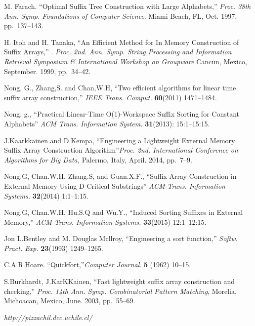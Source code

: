 \documentclass{ws-ijprai}
\begin{document}
\begin{thebibliography}{99}
 M. Farach. ``Optimal Suffix Tree Construction with
Large Alphabets,'' {\it Proc. 38th Ann. Symp. Foundations of Computer
Science}. Miami Beach, FL, Oct. 1997, pp.~137--143.

 H. Itoh and H. Tanaka, ``An Efficient Method for
In Memory Construction of Suffix Arrays,'' . {\it
Proc. 2nd. Ann. Symp. String Processing and Information Retrieval
Symposium \& International Workshop on Groupware} Cancun, Mexico,
September. 1999, pp.~34--42.

 Nong, G., Zhang,S. and Chan,W.H, ``Two efficient
algorithms for linear time suffix array construction,'' {\it IEEE
Trans. Comput.} {\bf 60}(2011) 1471--1484.

 Nong, g., ``Practical Linear-Time O(1)-Workspace
Suffix Sorting for Constant Alphabets'' {\it ACM Trans. Information
System.} {\bf 31}(2013): 15:1--15:15.

 J.Kaarkkainen and D.Kempa, ``Engineering a Lightweight
External Memory Suffix Array Construction Algorithm''{\it Proc. 2nd.
International Conference on Algorithms for Big Data,} Palermo, Italy,
April. 2014, pp.~7--9.

 Nong.G, Chan.W.H, Zhang.S, and Guan.X.F., ``Suffix
Array Construction in External Memory Using D-Critical Substrings''
{\it ACM Trans. Information Systems.} {\bf 32}(2014) 1:1--1:15.

 Nong.G, Chan.W.H, Hu.S.Q and Wu.Y., ``Induced Sorting
Suffixes in External Memory,'' {\it ACM Trans. Information Systems.}
{\bf 33}(2015) 12:1--12:15.

 Jon L.Bentley and M. Douglas Mcllroy,
``Engineering a sort function,'' {\it Softw. Pract. Exp.} {\bf
23}(1993) 1249--1265.

 C.A.R.Hoare. ``Quickfort,''{\it Computer
Journal}. {\bf 5} (1962) 10--15.

 S.Burkhardt, J.KarKKainen, ``Fast lightweight suffix
array construction and checking,'' {\it Proc. 14th
Ann. Symp. Combinatorial Pattern Matching}, Morelia, Michoacan,
Mexico, June. 2003, pp.~55--69.


 {\it http://pizzachil.dcc.uchile.cl/}




\end{thebibliography}
\end{document}
